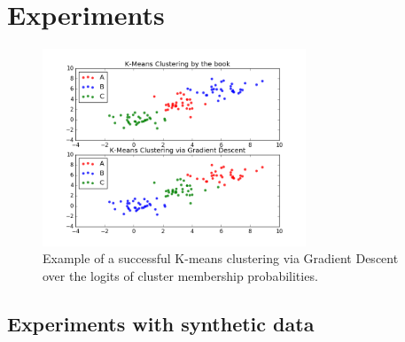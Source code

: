 \chapter{Experiments}
\label{experiments}


\begin{figure}
\centering
\includegraphics[width=0.7\textwidth]{imgs/gd_clust_good_attempt.png}
\caption{\label{fig:gd_clust_good} Example of a successful K-means clustering via Gradient Descent over the logits of cluster membership probabilities.}
\end{figure}
\section{Experiments with synthetic data}
